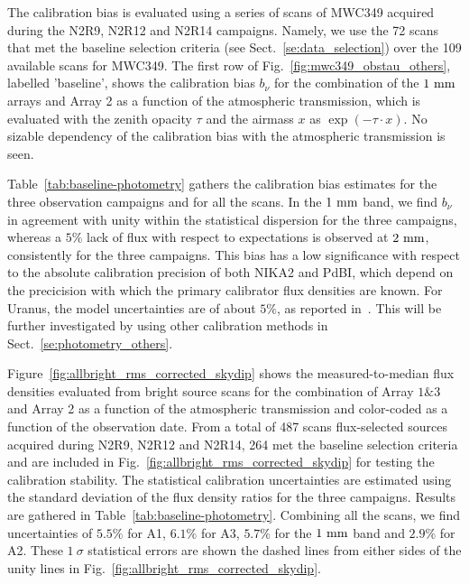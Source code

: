 The calibration bias is evaluated using a
series of scans of MWC349 acquired during the N2R9, N2R12 and N2R14
campaigns. Namely, we use the 72 scans that met the baseline selection
criteria (see Sect.~\ref{se:data_selection}) over the 109 available
scans for MWC349. The first row of
Fig.~\ref{fig:mwc349_obstau_others}, labelled 'baseline', shows the
calibration bias $b_{\nu}$ for the combination of the $1~\rm{mm}$ arrays and
Array 2 as a function of the atmospheric transmission, which is
evaluated with the zenith opacity $\tau$ and the airmass $x$ as
$\exp \left( - \tau \cdot x \right)$. No sizable dependency of the
calibration bias with the atmospheric transmission is seen. 

Table~\ref{tab:baseline-photometry} gathers the calibration bias
estimates for the three observation campaigns and for all the scans.
In the $1~\rm{mm}$ band, we find
$b_\nu$ in agreement with unity within the statistical dispersion for
the three campaigns,
whereas a $5\%$ lack of flux with respect to expectations is observed
at $2~\rm{mm}$, consistently for the three campaigns. This bias has a
low significance with respect to the absolute calibration precision of
both NIKA2 and PdBI, which depend on the precicision with which the
primary calibrator flux densities are known. For Uranus, the model
uncertainties are of about $5\%$, as reported
in~\citet{Morenothesis,Bendo2013}. This will be further investigated
by using other calibration methods in Sect.~\ref{se:photometry_others}.

Figure~\ref{fig:allbright_rms_corrected_skydip} shows the
measured-to-median flux densities evaluated from bright source scans
for the combination of Array $1\&3$ and Array 2 as a function of the
atmospheric transmission and color-coded as a function of the
observation date. From a total of 487 scans
flux-selected sources acquired during N2R9, N2R12 and N2R14, 264 met
the baseline selection criteria and are included in
Fig.~\ref{fig:allbright_rms_corrected_skydip} for testing the
calibration stability. The statistical calibration uncertainties are
estimated using the standard deviation of the flux density ratios for
the three campaigns. Results are gathered in
Table~\ref{tab:baseline-photometry}.
Combining all the scans, we find uncertainties of $5.5\%$ for A1,
$6.1\%$ for A3, $5.7\%$ for the $1~\rm{mm}$ band and $2.9\%$ for A2.
These $1~\sigma$ statistical errors are shown the dashed lines from
either sides of the unity lines in
Fig.~\ref{fig:allbright_rms_corrected_skydip}.


